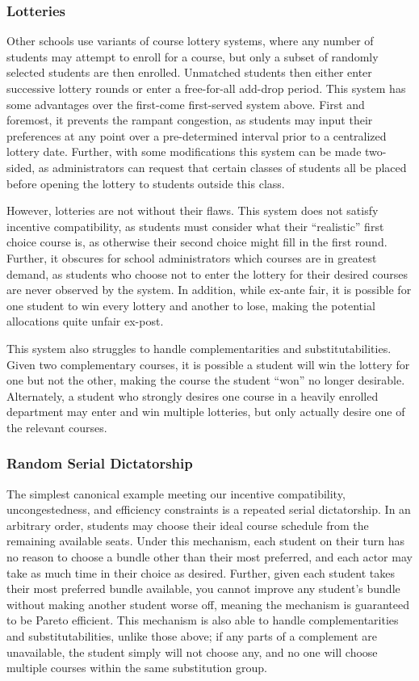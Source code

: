\documentclass{article}
\begin{document}
\subsubsection{Lotteries}

Other schools use variants of course lottery systems, where any number of students may attempt to enroll for a course, but only a subset of randomly selected students are then enrolled. Unmatched students then either enter successive lottery rounds or enter a free-for-all add-drop period. This system has some advantages over the first-come first-served system above. First and foremost, it prevents the rampant congestion, as students may input their preferences at any point over a pre-determined interval prior to a centralized lottery date. Further, with some modifications this system can be made two-sided, as administrators can request that certain classes of students all be placed before opening the lottery to students outside this class.

However, lotteries are not without their flaws. This system does not satisfy incentive compatibility, as students must consider what their ``realistic'' first choice course is, as otherwise their second choice might fill in the first round. Further, it obscures for school administrators which courses are in greatest demand, as students who choose not to enter the lottery for their desired courses are never observed by the system. In addition, while ex-ante fair, it is possible for one student to win every lottery and another to lose, making the potential allocations quite unfair ex-post. 

This system also struggles to handle complementarities and substitutabilities. Given two complementary courses, it is possible a student will win the lottery for one but not the other, making the course the student ``won'' no longer desirable. Alternately, a student who strongly desires one course in a heavily enrolled department may enter and win multiple lotteries, but only actually desire one of the relevant courses. 

\subsubsection{Random Serial Dictatorship}

The simplest canonical example meeting our incentive compatibility, uncongestedness, and efficiency constraints is a repeated serial dictatorship. In an arbitrary order, students may choose their ideal course schedule from the remaining available seats. Under this mechanism, each student on their turn has no reason to choose a bundle other than their most preferred, and each actor may take as much time in their choice as desired. Further, given each student takes their most preferred bundle available, you cannot improve any student's bundle without making another student worse off, meaning the mechanism is guaranteed to be Pareto efficient. This mechanism is also able to handle complementarities and substitutabilities, unlike those above; if any parts of a complement are unavailable, the student simply will not choose any, and no one will choose multiple courses within the same substitution group.
\end{document}
